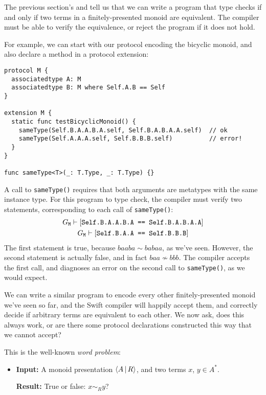 \documentclass[../generics]{subfiles}
\begin{document}
The previous section's  and  tell us that we can write a program that type checks if and only if two terms in a finitely-presented monoid are equivalent. The compiler must be able to verify the equivalence, or reject the program if it does not hold.

For example, we can start with our protocol encoding the bicyclic monoid, and also declare a method in a protocol extension:
\begin{Verbatim}
protocol M {
  associatedtype A: M
  associatedtype B: M where Self.A.B == Self
}

extension M {
  static func testBicyclicMonoid() {
    sameType(Self.B.A.A.B.A.self, Self.B.A.B.A.A.self)  // ok
    sameType(Self.A.A.A.self, Self.B.B.B.self)          // error!
  }
}

func sameType<T>(_: T.Type, _: T.Type) {}
\end{Verbatim}
A call to \texttt{sameType()} requires that both arguments are metatypes with the same instance type. For this program to type check, the compiler must verify two statements, corresponding to each call of \texttt{sameType()}:
\begin{gather*}
G_\texttt{M}\vdash[\texttt{Self.B.A.A.B.A == Self.B.A.B.A.A}]\\
G_\texttt{M}\vdash[\texttt{Self.B.A.A == Self.B.B.B}]
\end{gather*}
The first statement is true, because $baaba\sim babaa$, as we've seen. However, the second statement is actually false, and in fact $baa\not\sim bbb$. The compiler accepts the first call, and diagnoses an error on the second call to \texttt{sameType()}, as we would expect.

We can write a similar program to encode every other finitely-presented monoid we've seen so far, and the Swift compiler will happily accept them, and correctly decide if arbitrary terms are equivalent to each other. We now ask, does this always work, or are there some protocol declarations constructed this way that we cannot accept?

This is the well-known \emph{word problem}:
\begin{itemize}
\item
\textbf{Input:} A monoid presentation $\langle A\,|\,R\rangle$, and two terms $x$, $y\in A^*$.

\textbf{Result:} True or false: $x\sim_R y$?
\end{itemize}
\end{document}
